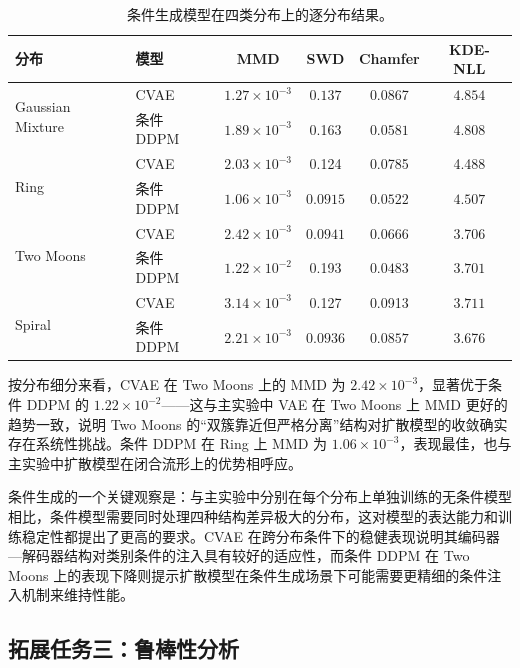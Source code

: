\documentclass[UTF8,a4paper,12pt]{ctexart}
\begin{document}
\begin{table}[H]
	\centering
	\footnotesize
	\caption{条件生成模型在四类分布上的逐分布结果。}
	\label{tab:conditional-detail}
	\begin{tabular}{llcccc}
		\toprule
		分布 & 模型 & MMD  & SWD  & Chamfer  & KDE-NLL  \\
		\midrule
		\multirow{2}{*}{Gaussian Mixture}
		& CVAE & $\mathbf{1.27}\times 10^{-3}$ & $\mathbf{0.137}$ & 0.0867 & $\mathbf{4.854}$ \\
		& 条件 DDPM & $1.89\times 10^{-3}$ & 0.163 & $\mathbf{0.0581}$ & 4.808 \\
		\midrule
		\multirow{2}{*}{Ring}
		& CVAE & $2.03\times 10^{-3}$ & 0.124 & 0.0785 & 4.488 \\
		& 条件 DDPM & $\mathbf{1.06}\times 10^{-3}$ & $\mathbf{0.0915}$ & $\mathbf{0.0522}$ & $\mathbf{4.507}$ \\
		\midrule
		\multirow{2}{*}{Two Moons}
		& CVAE & $\mathbf{2.42}\times 10^{-3}$ & $\mathbf{0.0941}$ & 0.0666 & 3.706 \\
		& 条件 DDPM & $1.22\times 10^{-2}$ & 0.193 & $\mathbf{0.0483}$ & $\mathbf{3.701}$ \\
		\midrule
		\multirow{2}{*}{Spiral}
		& CVAE & $3.14\times 10^{-3}$ & 0.127 & 0.0913 & $\mathbf{3.711}$ \\
		& 条件 DDPM & $\mathbf{2.21}\times 10^{-3}$ & $\mathbf{0.0936}$ & $\mathbf{0.0857}$ & 3.676 \\
		\bottomrule
	\end{tabular}
\end{table}

按分布细分来看，CVAE 在 Two Moons 上的 MMD 为 $2.42\times 10^{-3}$，显著优于条件 DDPM 的 $1.22\times 10^{-2}$——这与主实验中 VAE 在 Two Moons 上 MMD 更好的趋势一致，说明 Two Moons 的“双簇靠近但严格分离”结构对扩散模型的收敛确实存在系统性挑战。条件 DDPM 在 Ring 上 MMD 为 $1.06\times 10^{-3}$，表现最佳，也与主实验中扩散模型在闭合流形上的优势相呼应。

条件生成的一个关键观察是：与主实验中分别在每个分布上单独训练的无条件模型相比，条件模型需要同时处理四种结构差异极大的分布，这对模型的表达能力和训练稳定性都提出了更高的要求。CVAE 在跨分布条件下的稳健表现说明其编码器—解码器结构对类别条件的注入具有较好的适应性，而条件 DDPM 在 Two Moons 上的表现下降则提示扩散模型在条件生成场景下可能需要更精细的条件注入机制来维持性能。

\subsection{拓展任务三：鲁棒性分析}
\end{document}
